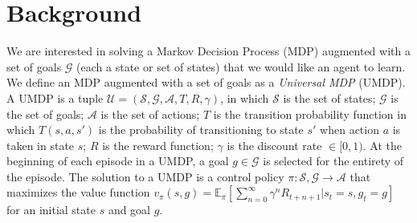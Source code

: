 \documentclass{article} %
\begin{document}

 
\section{Background}
\label{sect:background}

We are interested in solving a Markov Decision Process (MDP) augmented with a set of goals $\mathcal{G}$ (each a state or set of states) that we would like an agent to learn.  We define an MDP augmented with a set of goals as a \textit{Universal MDP} (UMDP). A UMDP is a tuple $\mathcal{U} = (\mathcal{S}, \mathcal{G}, \mathcal{A}, T, R, \gamma)$, in which $\mathcal{S}$ is the set of states; $\mathcal{G}$ is the set of goals;  $\mathcal{A}$ is the set of actions; $T$ is the transition probability function in which $T(s,a,s')$ is the probability of transitioning to state $s'$ when action $a$ is taken in state $s$; $R$ is the reward function; $\gamma$ is the discount rate $\in [0,1)$.  At the beginning of each episode in a UMDP, a goal $g \in \mathcal{G}$ is selected for the entirety of the episode.  The solution to a UMDP is a control policy $\pi : \mathcal{S},\mathcal{G} \rightarrow \mathcal{A}$ that maximizes  the value function $v_{\pi}(s,g)=\mathbb{E}_{\pi}[\sum\nolimits_{n=0}^\infty \gamma^n R_{t+n+1}|s_t=s,g_t=g]$ for an initial state $s$ and goal $g$.    
\end{document}
